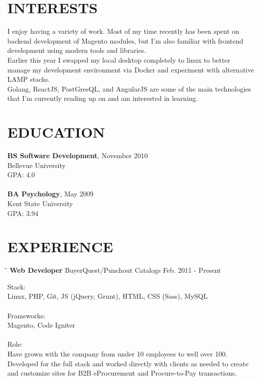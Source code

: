 \documentclass{res}
\begin{document}
\begin{resume}
\section{INTERESTS}          
    I enjoy having a variety of work. Most of my time recently has been spent on backend
    development of Magento modules, but I'm also familiar with frontend development using
    modern tools and libraries. \\
    Earlier this year I swapped my local desktop completely to linux to better
    manage my development environment via Docker and experiment with alternative
    LAMP stacks. \\
    Golang, ReactJS, PostGresQL, and AngularJS are some of the main technologies that I'm currently
    reading up on and am interested in learning.
    
 
\section{EDUCATION}
    \textbf{BS Software Development}, November 2010 \\
    Bellevue University \\    
    GPA: 4.0 \\  
    \\
    \textbf{BA Psychology}, May 2009 \\
    Kent State University \\    
    GPA: 3.94
 
\section{EXPERIENCE}
   \vspace{-0.1in}	
   
   \begin{tabbing}
   		\hspace{2.0in}\= \hspace{2.7in}\= \kill %
    	\textbf{Web Developer} \>BuyerQuest/Punchout Catalogs     \>Feb. 2011 - Present\\
   \end{tabbing}\vspace{-20pt}      %
   
    Stack: \\
	Linux, PHP, Git, JS (jQuery, Grunt), HTML, CSS (Sass), MySQL \\
	\\
	Frameworks: \\
	Magento, Code Igniter \\
	\\
	Role: \\
	Have grown with the company from under 10 employees to well over 100. \\
	Developed for the full stack and worked directly with clients as needed to
	create and customize sites for B2B eProcurement and Procure-to-Pay transactions. 
    

\end{resume}
\end{document}
